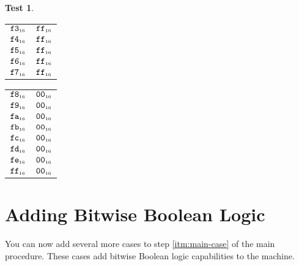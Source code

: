 \documentclass[a4paper,12pt]{article}
\makeatletter
\newcommand{\num}[1]{\texttt{\MakeLowercase{#1}}}
\newcommand{\hex}[1]{\num{#1}_{\textup{\tiny 16}}}
\newcommand{\MEM}[1]{\ifthenelse{\equal{#1}{}}{M}{M[#1]}}
\theoremstyle{definition}
\newtheorem{test}{Test}
\newenvironment{memtable}{%
  \begin{trivlist}
    \item
    }{%
    \end{trivlist}}
\newenvironment{memcolumn}{%
  \begin{tabular}{@{}ll@{}}
    \hline}
    {%
    \hline
  \end{tabular}}
\newcommand{\memspace}{\qquad}
\makeatother
\begin{document}
\begin{test}
\begin{memtable}
\begin{memcolumn}
      $\hex{F3}$ & $\hex{FF}$ \\
      $\hex{F4}$ & $\hex{FF}$ \\
      $\hex{F5}$ & $\hex{FF}$ \\
      $\hex{F6}$ & $\hex{FF}$ \\
      $\hex{F7}$ & $\hex{FF}$ \\
    \end{memcolumn}
    \memspace
    \begin{memcolumn}
      $\hex{F8}$ & $\hex{00}$ \\
      $\hex{F9}$ & $\hex{00}$ \\
      $\hex{FA}$ & $\hex{00}$ \\
      $\hex{FB}$ & $\hex{00}$ \\
      $\hex{FC}$ & $\hex{00}$ \\
      $\hex{FD}$ & $\hex{00}$ \\
      $\hex{FE}$ & $\hex{00}$ \\
      $\hex{FF}$ & $\hex{00}$ \\
    \end{memcolumn}
  \end{memtable}
\end{test}

\section{Adding Bitwise Boolean Logic}

You can now add several more cases to step \ref{itm:main-case} of the main procedure.
These cases add bitwise Boolean logic capabilities to the machine.
\end{document}
